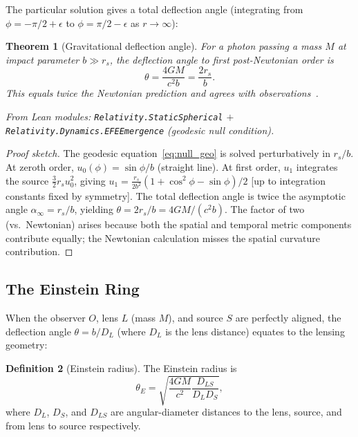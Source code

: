 \documentclass[12pt,a4paper]{article}
\newtheorem{theorem}{Theorem}[section]
\theoremstyle{definition}
\newtheorem{definition}[theorem]{Definition}
\theoremstyle{remark}
\begin{document}
The particular solution gives a total deflection angle (integrating from
$\phi = -\pi/2 + \epsilon$ to $\phi = \pi/2 - \epsilon$ as $r \to \infty$):

\begin{theorem}[Gravitational deflection angle]\label{thm:deflection}
For a photon passing a mass $M$ at impact parameter $b \gg r_s$, the
deflection angle to first post-Newtonian order is
\begin{equation}
  \theta = \frac{4GM}{c^2 b} = \frac{2r_s}{b}.
  \label{eq:deflection}
\end{equation}
This equals twice the Newtonian prediction and agrees with
observations~\cite{Eddington1920,VLBI2004}.

From Lean modules:
\texttt{Relativity.StaticSpherical} $+$
\texttt{Relativity.Dynamics.EFEEmergence} (geodesic null condition).
\end{theorem}

\begin{proof}[Proof sketch]
The geodesic equation~\eqref{eq:null_geo} is solved perturbatively in
$r_s/b$.  At zeroth order, $u_0(\phi) = \sin\phi/b$ (straight line).
At first order, $u_1$ integrates the source $\tfrac{3}{2}r_s u_0^2$,
giving $u_1 = \tfrac{r_s}{2b^2}(1 + \cos^2\phi - \sin\phi)/2$ [up to
integration constants fixed by symmetry].  The total deflection angle
is twice the asymptotic angle $\alpha_\infty = r_s/b$, yielding
$\theta = 2r_s/b = 4GM/(c^2 b)$.  The factor of two (vs.\ Newtonian)
arises because both the spatial and temporal metric components
contribute equally; the Newtonian calculation misses the spatial
curvature contribution.
\end{proof}

\subsection{The Einstein Ring}

When the observer $O$, lens $L$ (mass $M$), and source $S$ are
perfectly aligned, the deflection angle $\theta = b/D_L$ (where $D_L$
is the lens distance) equates to the lensing geometry:

\begin{definition}[Einstein radius]
The Einstein radius is
\begin{equation}
  \theta_E = \sqrt{\frac{4GM}{c^2}\frac{D_{LS}}{D_L D_S}},
  \label{eq:einstein_radius}
\end{equation}
where $D_L$, $D_S$, and $D_{LS}$ are angular-diameter distances to the
lens, source, and from lens to source respectively.
\end{definition}
\end{document}
